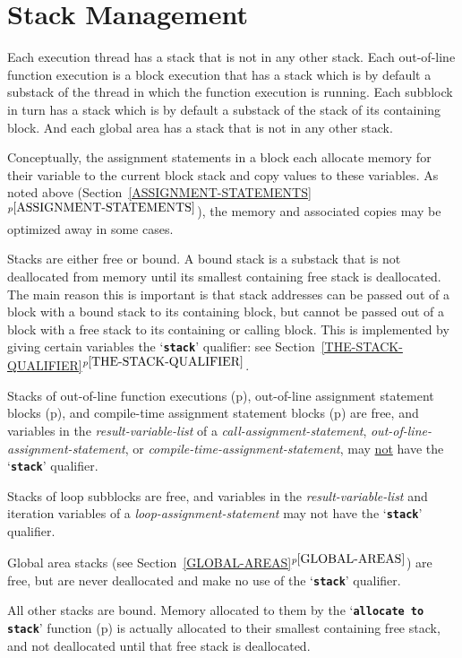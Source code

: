 \documentclass[12pt]{article}
\newcommand{\TT}[1]{{\tt \bfseries #1}}
\newcommand{\itemref}[1]{\ref{#1}$^{p\pageref{#1}}$}
\newcommand{\pagref}[1]{p\pageref{#1}}
\begin{document}
\section{Stack Management}
\label{STACK-MANAGEMENT}

Each execution thread has a stack that is not in any other
stack.  Each out-of-line function
execution is a block execution that has a stack which is
by default a substack of the thread in which the function
execution is running.  Each subblock in turn has a stack
which is by default a substack of the stack of its containing block.
And each global area has a stack that is not in any other stack.

Conceptually, the assignment statements in a block each allocate memory for
their variable to the current block stack and copy values to these
variables.  As noted above (Section~\itemref{ASSIGNMENT-STATEMENTS}),
the memory and associated copies may be
optimized away in some cases.

Stacks are either free or bound.\label{FREE-STACK}
A bound stack is a substack that is
not deallocated from memory until its smallest containing free stack is
deallocated.  The main reason this is important is that stack addresses
can be passed out of a block with a bound stack to its containing block,
but cannot be passed out of a block with a free stack to its containing
or calling block.  This is implemented by giving certain
variables the `\TT{stack}' qualifier: see
Section~\itemref{THE-STACK-QUALIFIER}.

Stacks of out-of-line function executions
(\pagref{OUT-OF-LINE-FUNCTIONS}),
out-of-line assignment statement blocks
(\pagref{OUT-OF-LINE-ASSIGNMENT-STATEMENTS}),
and
compile-time assignment statement blocks
(\pagref{COMPILE-TIME-ASSIGNMENT-STATEMENTS})
are free, and variables in the {\em result-variable-list}
of a {\em call-assignment-statement},
{\em out-of-line-assignment-statement}, or
{\em compile-time-assignment-statement},
may \underline{not} have the `\TT{stack}' qualifier.

Stacks of loop subblocks are free, and
variables in the {\em result-variable-list}
and iteration variables
of a {\em loop-assignment-statement} may not have the `\TT{stack}'
qualifier.

Global area stacks (see Section~\itemref{GLOBAL-AREAS}) are free,
but are never deallocated and make no use of the `\TT{stack}'
qualifier.

All other stacks are bound.  Memory allocated to them
by the `\TT{allocate to stack}' function (\pagref{ALLOCATE-TO-STACK})
is actually
allocated to their smallest containing free stack, and not deallocated
until that free stack is deallocated.
\end{document}
